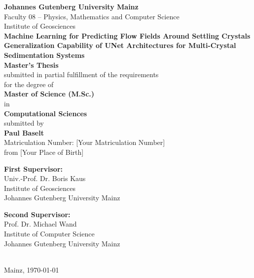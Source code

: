 \begin{titlepage}
    \centering
    
    
    {\large \textbf{Johannes Gutenberg University Mainz}}\\[0.5cm]
    {\large Faculty 08 -- Physics, Mathematics and Computer Science}\\[0.5cm]
    {\large Institute of Geosciences}\\[2cm]
    
    {\huge \textbf{Machine Learning for Predicting Flow Fields Around Settling Crystals}}\\[0.5cm]
    {\LARGE \textbf{Generalization Capability of UNet Architectures for Multi-Crystal Sedimentation Systems}}\\[1.5cm]
    
    {\Large \textbf{Master's Thesis}}\\[0.5cm]
    submitted in partial fulfillment of the requirements\\[0.3cm]
    for the degree of\\[0.3cm]
    {\large \textbf{Master of Science (M.Sc.)}}\\[0.3cm]
    in\\[0.3cm]
    {\large \textbf{Computational Sciences}}\\[2cm]
    
    submitted by\\[0.5cm]
    {\large \textbf{Paul Baselt}}\\[0.3cm]
    Matriculation Number: [Your Matriculation Number]\\[0.3cm]
    from [Your Place of Birth]\\[1.5cm]
    
    \begin{minipage}[t]{0.45\textwidth}
        \centering
        \textbf{First Supervisor:}\\
        Univ.-Prof. Dr. Boris Kaus\\
        Institute of Geosciences\\
        Johannes Gutenberg University Mainz
    \end{minipage}
    \hfill
    \begin{minipage}[t]{0.45\textwidth}
        \centering
        \textbf{Second Supervisor:}\\
        Prof. Dr. Michael Wand\\
        Institute of Computer Science\\
        Johannes Gutenberg University Mainz
    \end{minipage}\\[2cm]
    
    \vfill
    {\large Mainz, \today}
    
\end{titlepage}